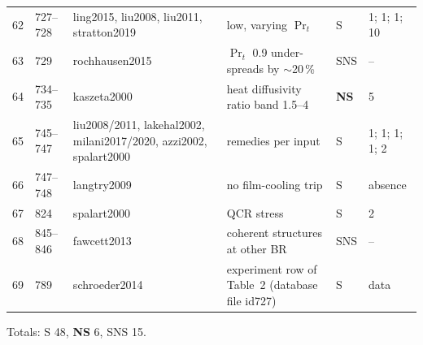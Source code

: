 \documentclass[10pt,a4paper]{article}
\newcommand{\vS}{\textsf{S}}
\newcommand{\vNS}{\textbf{\textsf{NS}}}
\newcommand{\vSNS}{\textsf{SNS}}
\begin{document}
{\begin{longtable}{@{}r P{11mm} P{36mm} P{70mm} P{12mm} P{18mm}@{}}
62 & 727--728 & ling2015, liu2008, liu2011, stratton2019 & low, varying $\Pr_t$ & \vS & 1; 1; 1; 10 \\
63 & 729 & rochhausen2015 & $\Pr_t$ 0.9 under-spreads by $\sim$20\,\% & \vSNS & -- \\
64 & 734--735 & kaszeta2000 & heat diffusivity ratio band 1.5--4 & \vNS & 5 \\
65 & 745--747 & liu2008/2011, lakehal2002, milani2017/2020, azzi2002, spalart2000 & remedies per input & \vS & 1; 1; 1; 1; 2 \\
66 & 747--748 & langtry2009 & no film-cooling trip & \vS & absence \\
67 & 824 & spalart2000 & QCR stress & \vS & 2 \\
68 & 845--846 & fawcett2013 & coherent structures at other BR & \vSNS & -- \\
69 & 789 & schroeder2014 & experiment row of Table~2 (database file id727) & \vS & data \\
\bottomrule
\end{longtable}}
Totals: \vS{} 48, \vNS{} 6, \vSNS{} 15.
\end{document}
